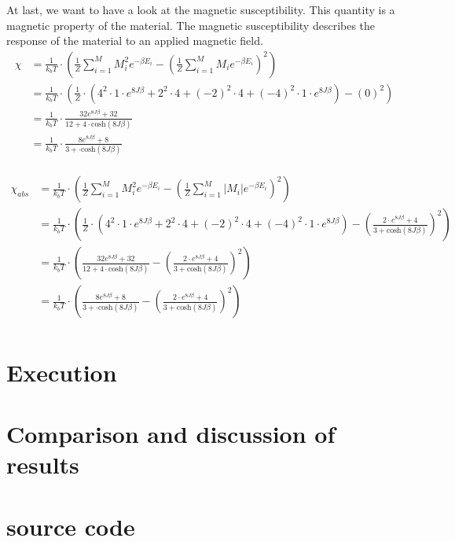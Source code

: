 \documentclass[10pt,a4paper]{article}
\begin{document}
At last, we want to have a look at the magnetic susceptibility. This quantity is a magnetic property of the material. The magnetic susceptibility describes the response of the material to an applied magnetic field. 
\begin{align}
\chi &= \frac{1}{k_b T} \cdot \left( \frac{1}{Z} \sum_{i=1}^{M} M_i^2 e^{- \beta E_i } - \left( \frac{1}{Z} \sum_{i=1}^{M} M_i e^{- \beta E_i }  \right)^2 \right)\\
&= \frac{1}{k_b T} \cdot \left( \frac{1}{Z} \cdot \left( 4^2 \cdot 1 \cdot e^{8J\beta}+ 2^2 \cdot 4+(-2)^2 \cdot 4 + (-4)^2 \cdot 1 \cdot e^{8J \beta } \right) - \left( 0  \right)^2 \right)\\
&= \frac{1}{k_b T} \cdot \frac{32 e^{8J\beta}+32}{ 12+ 4 \cdot \mathrm{cosh} \left( 8J \beta \right)}\\
&= \frac{1}{k_b T} \cdot \frac{8 e^{8J\beta}+8}{ 3+ \cdot \mathrm{cosh} \left( 8J \beta \right)}\\
\end{align}

\begin{align}
\chi_{abs} &= \frac{1}{k_b T} \cdot \left( \frac{1}{Z} \sum_{i=1}^{M} M_i^2 e^{- \beta E_i } - \left( \frac{1}{Z} \sum_{i=1}^{M} |M_i| e^{- \beta E_i }  \right)^2 \right)\\
&= \frac{1}{k_b T} \cdot \left( \frac{1}{Z} \cdot \left( 4^2 \cdot 1 \cdot e^{8J\beta}+ 2^2 \cdot 4+(-2)^2 \cdot 4 + (-4)^2 \cdot 1 \cdot e^{8J \beta } \right) - \left( \frac{2 \cdot e^{8J\beta}+4}{3+ \mathrm{cosh}(8J\beta)} \right)^2 \right)\\
&= \frac{1}{k_b T} \cdot \left( \frac{32 e^{8J\beta}+32}{ 12+ 4 \cdot \mathrm{cosh} \left( 8J \beta \right)}- \left( \frac{2 \cdot e^{8J\beta}+4}{3+ \mathrm{cosh}(8J\beta)} \right)^2 \right)\\
&= \frac{1}{k_b T} \cdot \left(\frac{8 e^{8J\beta}+8}{ 3+ \cdot \mathrm{cosh} \left( 8J \beta \right)}- \left( \frac{2 \cdot e^{8J\beta}+4}{3+ \mathrm{cosh}(8J\beta)} \right)^2 \right)\\
\end{align}

\section{Execution}

\section{Comparison and discussion of results}

\section{source code}
\end{document}
